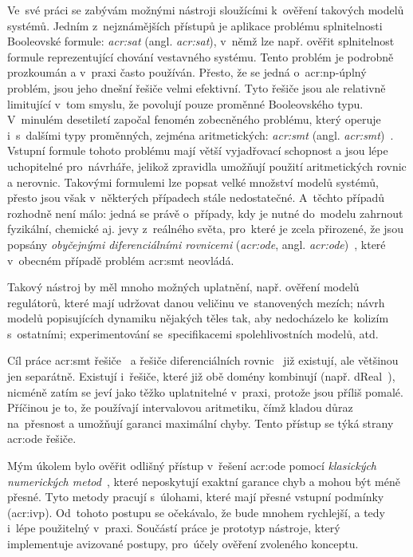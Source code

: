 \documentclass[thesis=M,czech]{FITthesis}[2012/06/26]
\newcommand{\acrlabel}[1]{acr:#1}
\newcommand{\acr}[1]{\acrshort{\acrlabel{#1}}}
\newcommand{\acrl}[1]{\acrlong{\acrlabel{#1}}}
\newcommand{\hl}[1]{\textit{#1}}
\newcommand{\name}[1]{\hl{#1}}
\newcommand{\cit}[1]{\cite{#1}}
\begin{document}
\begin{introduction}
Ve~své práci se zabývám možnými nástroji
sloužícími k~ověření takových modelů systémů.
Jedním z~nejznámějších přístupů
je aplikace problému splnitelnosti Booleovské formule:
\name{\acr{sat}} (angl. \name{\acrl{sat}}),
v~němž lze např. ověřit splnitelnost
formule reprezentující chování vestavného systému.
Tento problém je podrobně prozkoumán
a v~praxi často používán.
Přesto, že se jedná o~\acr{np}-úplný problém,
jsou jeho dnešní řešiče velmi efektivní.
Tyto řešiče jsou ale relativně limitující
v~tom smyslu, že povolují pouze proměnné Booleovského typu.
V~minulém desetiletí započal fenomén
zobecněného problému,
který operuje i~s~dalšími typy proměnných,
zejména aritmetických: \name{\acr{smt}}
(angl. \name{\acrl{smt}})~\cit{smt-de_moura}\cit{smt}.
Vstupní formule tohoto problému mají
větší vyjadřovací schopnost
a jsou lépe uchopitelné pro~návrháře,
jelikož zpravidla umožňují použití
aritmetických rovnic a nerovnic.
Takovými formulemi lze popsat velké množství modelů systémů,
přesto jsou však v~některých případech stále nedostatečné.
A~těchto případů rozhodně není málo:
jedná se právě o~případy, kdy je nutné
do~modelu zahrnout fyzikální, chemické aj.
jevy z~reálného světa,
pro~které je zcela přirozené,
že jsou popsány \name{obyčejnými diferenciálními rovnicemi}
(\name{\acr{ode}}, angl. \name{\acrl{ode}})~\cit{ode-lec}\cit{ode},
které v~obecném případě problém \acr{smt} neovládá.

Takový nástroj by měl mnoho možných uplatnění,
např. ověření modelů regulátorů,
které mají udržovat danou veličinu ve~stanovených mezích;
návrh modelů popisujících dynamiku nějakých těles
tak, aby nedocházelo ke~kolizím s~ostatními;
experimentování se~specifikacemi
spolehlivostních modelů,
atd.


\begin{section}{Cíl práce}\label{s:intro:goal}
\acr{smt} řešiče~\cit{opensmt-art}\cit{cvc4-art}
a řešiče diferenciálních rovnic~\cit{sundials-art}\cit{odeint-art}
již existují, ale většinou jen separátně.
Existují i~řešiče, které již obě domény kombinují
(např. dReal~\cit{dreal-art}),
nicméně zatím se jeví jako těžko uplatnitelné v~praxi,
protože jsou příliš pomalé.
Příčinou je to, že používají intervalovou aritmetiku,
čímž kladou důraz na~přesnost
a umožňují garanci maximální chyby.
Tento přístup se týká strany
\acr{ode} řešiče.

Mým úkolem bylo ověřit
odlišný přístup v~řešení \acr{ode}
pomocí \name{klasických numerických metod}~\cit{ode-nsolve-intro},
které neposkytují exaktní garance chyb
a mohou být méně přesné.
Tyto metody pracují s~úlohami,
které mají přesné vstupní podmínky (\acr{ivp}).
Od~tohoto postupu se očekávalo,
že bude mnohem rychlejší,
a tedy i~lépe použitelný v~praxi.
Součástí práce je prototyp nástroje,
který implementuje avizované postupy,
pro~účely ověření zvoleného konceptu.


\end{section}
\end{introduction}
\end{document}
